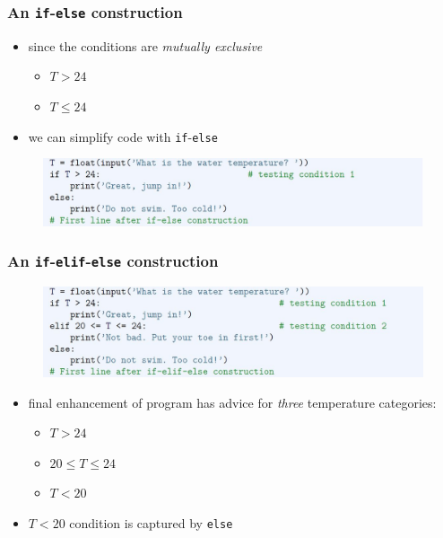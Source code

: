 \documentclass[english,14pt]{beamer}
\newcommand\red[1]{{\color{red} #1}}
\begin{document}

\begin{frame}[fragile]

\frametitle{An \texttt{if}-\texttt{else} construction}

\begin{itemize}
	\item since the conditions are \red{\emph{mutually exclusive}}
	\begin{itemize}
		\item $T > 24$
		\item $T \leq 24$
	\end{itemize}
	\item we can simplify code with \texttt{if}-\texttt{else}
\end{itemize}
	
\begin{figure}[ht]
	\centering
	\includegraphics[width=\textwidth]{figures/LLp69a}
\end{figure}

\end{frame}


\begin{frame}[fragile]

\frametitle{An \texttt{if}-\texttt{elif}-\texttt{else} construction}

\begin{figure}[ht]
	\centering
	\includegraphics[width=\textwidth]{figures/LLp69b}
\end{figure}

\begin{itemize}
\item final enhancement of program has advice for \emph{three} temperature categories:
	\begin{itemize}
		\item $T > 24$
		\item $20 \leq T \leq 24$
		\item $T < 20$
	\end{itemize}
	\item $T < 20$ condition is captured by \texttt{else}
\end{itemize}

\end{frame}
\end{document}
